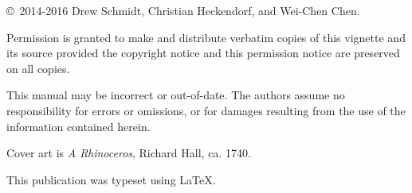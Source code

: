 \null
\vfill
\copyright\ 2014-2016 Drew Schmidt, Christian Heckendorf, and Wei-Chen Chen.

Permission is granted to make and distribute verbatim copies of
this vignette and its source provided the copyright notice and
this permission notice are preserved on all copies.

This manual may be incorrect or out-of-date.  The authors assume
no responsibility for errors or omissions, or for damages resulting
from the use of the information contained herein.

Cover art is \textit{A Rhinoceros}, Richard Hall, ca. 1740.

This publication was typeset using \LaTeX.
